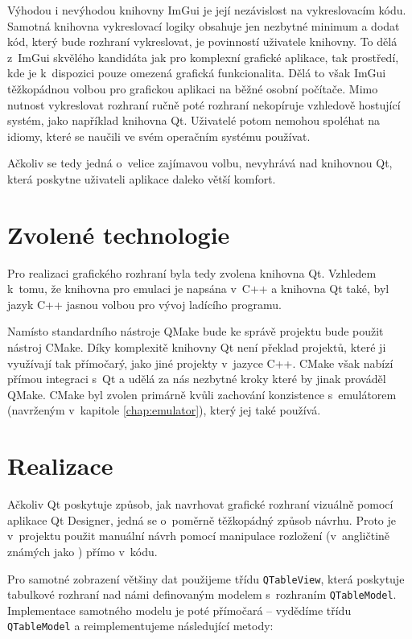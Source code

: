 
Výhodou i nevýhodou knihovny ImGui je její nezávislost na vykreslovacím kódu. Samotná knihovna vykreslovací logiky obsahuje jen nezbytné minimum a dodat kód, který bude rozhraní vykreslovat, je povinností uživatele knihovny. To dělá z~ImGui skvělého kandidáta jak pro komplexní grafické aplikace, tak prostředí, kde je k~dispozici pouze omezená grafická funkcionalita. Dělá to však ImGui těžkopádnou volbou pro grafickou aplikaci na běžné osobní počítače. Mimo nutnost vykreslovat rozhraní ručně poté rozhraní nekopíruje vzhledově hostující systém, jako například knihovna Qt. Uživatelé potom nemohou spoléhat na idiomy, které se naučili ve svém operačním systému používat.

Ačkoliv se tedy jedná o~velice zajímavou volbu, nevyhrává nad knihovnou Qt, která poskytne uživateli aplikace daleko větší komfort.

\section{Zvolené technologie}

Pro realizaci grafického rozhraní byla tedy zvolena knihovna Qt. Vzhledem k~tomu, že knihovna pro emulaci je napsána v~C++ a knihovna Qt také, byl jazyk C++ jasnou volbou pro vývoj ladícího programu.

Namísto standardního nástroje QMake bude ke správě projektu bude použit nástroj CMake. Díky komplexitě knihovny Qt není překlad projektů, které ji využívají tak přímočarý, jako jiné projekty v~jazyce C++. CMake však nabízí přímou integraci s~Qt a udělá za nás nezbytné kroky které by jinak prováděl QMake. CMake byl zvolen primárně kvůli zachování konzistence s~emulátorem (navrženým v~kapitole \ref{chap:emulator}), který jej také používá.

\section{Realizace}

Ačkoliv Qt poskytuje způsob, jak navrhovat grafické rozhraní vizuálně pomocí aplikace Qt Designer\cite{qt-designer}, jedná se o~poměrně těžkopádný způsob návrhu. Proto je v~projektu použit manuální návrh pomocí manipulace rozložení (v~angličtině známých jako ) přímo v~kódu.

Pro samotné zobrazení většiny dat použijeme třídu \texttt{QTableView}, která poskytuje tabulkové rozhraní nad námi definovaným modelem s~rozhraním \texttt{QTableModel}. Implementace samotného modelu je poté přímočará -- vydědíme třídu \texttt{QTableModel} a reimplementujeme následující metody:

